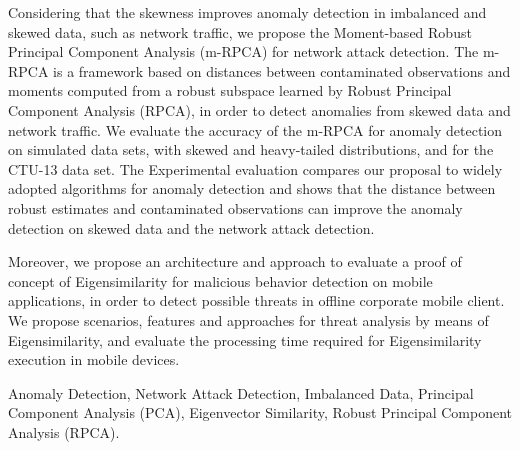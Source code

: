 Considering that the skewness improves anomaly detection in imbalanced and skewed data, such as network traffic, we propose the Moment-based Robust Principal Component Analysis (m-RPCA) for network attack detection. The m-RPCA is a framework based on distances between contaminated observations and moments computed from a robust subspace learned by Robust Principal Component Analysis (RPCA), in order to detect anomalies from skewed data and network traffic. We evaluate the accuracy of the m-RPCA for anomaly detection on simulated data sets, with skewed and heavy-tailed distributions, and for the CTU-13 data set. The Experimental evaluation compares our proposal to widely adopted algorithms for anomaly detection and shows that the distance between robust estimates and contaminated observations can improve the anomaly detection on skewed data and the network attack detection.

Moreover, we propose an architecture and approach to evaluate a proof of concept of Eigensimilarity for malicious behavior detection on mobile applications, in order to detect possible threats in offline corporate mobile client. We propose scenarios, features and approaches for threat analysis by means of Eigensimilarity, and evaluate the processing time required for Eigensimilarity execution in mobile devices.

\begin{keywords}
Anomaly Detection, Network Attack Detection, Imbalanced Data, Principal Component Analysis (PCA), Eigenvector Similarity, Robust Principal Component Analysis (RPCA).
\end{keywords}
